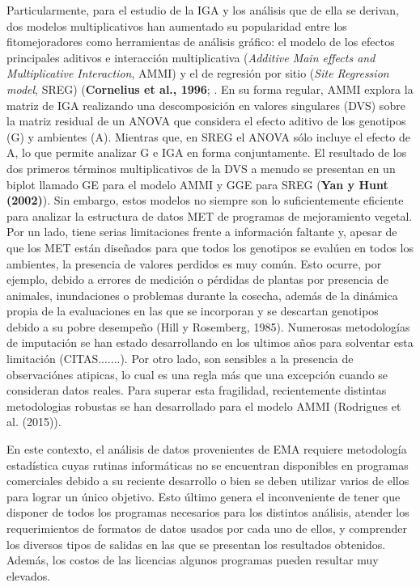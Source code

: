 Particularmente, para el estudio de la IGA y los análisis que de ella se derivan, dos modelos multiplicativos han aumentado su popularidad entre los fitomejoradores como herramientas de análisis gráfico: el modelo de los efectos principales aditivos e interacción multiplicativa (\emph{Additive Main effects and Multiplicative Interaction}, AMMI) \citep{Kempton1984,Gauch1988} y el de regresión por sitio (\emph{Site Regression model}, SREG) (\textbf{Cornelius et al., 1996}; \citep{GauchZobel1997}. En su forma regular, AMMI explora la matriz de IGA realizando una descomposición en valores singulares (DVS) sobre la matriz residual de un ANOVA que considera el efecto aditivo de los genotipos (G) y ambientes (A). Mientras que, en SREG el ANOVA sólo incluye el efecto de A, lo que permite analizar G e IGA en forma conjuntamente. El resultado de los dos primeros términos multiplicativos de la DVS a menudo se presentan en un biplot llamado GE para el modelo AMMI y GGE para SREG (\textbf{Yan y Hunt (2002)}). Sin embargo, estos modelos no siempre son lo suficientemente eficiente para analizar la estructura de datos MET de programas de mejoramiento vegetal. Por un lado, tiene serias limitaciones frente a información faltante y, apesar de que los MET están diseñados para que todos los genotipos se evalúen en todos los ambientes, la presencia de valores perdidos es muy común. Esto ocurre, por ejemplo, debido a errores de medición o pérdidas de plantas por presencia de animales, inundaciones o problemas durante la cosecha, además de la dinámica propia de la evaluaciones en las que se incorporan y se descartan genotipos debido a su pobre desempeño (Hill y Rosemberg, 1985). Numerosas metodologías de imputación se han estado desarrollando en los ultimos años para solventar esta limitación (CITAS.......). Por otro lado, son sensibles a la presencia de observaciónes atipicas, lo cual es una regla más que una excepción cuando se consideran datos reales. Para superar esta fragilidad, recientemente distintas metodologias robustas se han desarrollado para el modelo AMMI (Rodrigues et al. (2015)). 


En este contexto, el análisis de datos provenientes de EMA requiere metodología estadística cuyas rutinas informáticas no se encuentran disponibles en programas comerciales debido a su reciente desarrollo o bien se deben utilizar varios de ellos para lograr un único objetivo. Esto último genera el inconveniente de tener que disponer de todos los programas necesarios para los distintos análisis, atender los requerimientos de formatos de datos usados por cada uno de ellos, y comprender los diversos tipos de salidas en las que se presentan los resultados obtenidos. Además, los costos de las licencias algunos programas pueden resultar muy elevados. 

